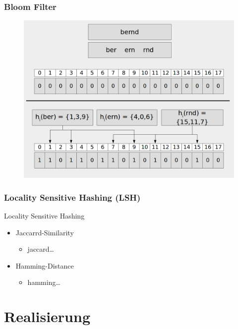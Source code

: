 \documentclass{beamer}
\begin{document}
	\begin{frame}
    		\frametitle{Bloom Filter}
            \begin{figure}[H]
                \includegraphics[width=\textwidth]{graphics/bloom_qgram.png}
            \end{figure}
    \end{frame}
    
    \begin{frame}
        \frametitle{Locality Sensitive Hashing (LSH)}
            Locality Sensitive Hashing
            \begin{itemize}
                \item Jaccarrd-Similarity
                    \begin{itemize}
                        \item jaccard\ldots
                    \end{itemize}
                \item Hamming-Distance
                    \begin{itemize}
                        \item hamming\ldots
                    \end{itemize}
            \end{itemize}
    \end{frame}
    \section[Section]{Realisierung}
    
\end{document}
